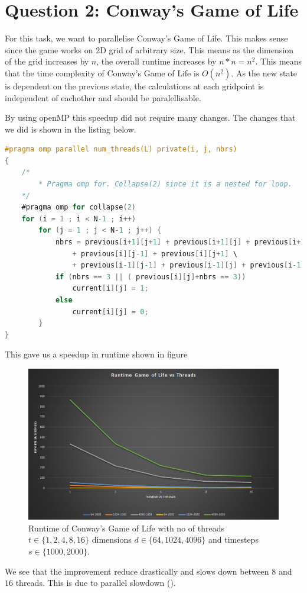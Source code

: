 \section{Question 2: Conway's Game of Life}

For this task, we want to parallelise Conway's Game of Life. 
This makes sense since the game works on 2D grid of arbitrary size. This means 
as the dimension of the grid increases by $n$, the overall runtime increases by
$n*n=n^2$. This means that the time complexity of Conway's Game of Life is 
$O(n^2)$. As the new state is dependent on the previous state, the calculations
at each gridpoint is independent of eachother and should be paralellisable.

By using openMP this speedup did not require many changes. The changes that we did
is shown in the listing below.

\begin{lstlisting}[language=C]
#pragma omp parallel num_threads(L) private(i, j, nbrs)
{
    /*
        * Pragma omp for. Collapse(2) since it is a nested for loop.
    */
    #pragma omp for collapse(2)
    for (i = 1 ; i < N-1 ; i++)
        for (j = 1 ; j < N-1 ; j++) {
            nbrs = previous[i+1][j+1] + previous[i+1][j] + previous[i+1][j-1] \
                + previous[i][j-1] + previous[i][j+1] \
                + previous[i-1][j-1] + previous[i-1][j] + previous[i-1][j+1];
            if (nbrs == 3 || ( previous[i][j]+nbrs == 3))
                current[i][j] = 1;
            else 
                current[i][j] = 0;
        }
}
\end{lstlisting}

This gave us a speedup in runtime shown in figure

\begin{figure}
    \centering
    \includegraphics[width=\linewidth]{Figures/Runtimes.png}
    \caption{
        Runtime of Conway's Game of Life with no of threads $t \in \{1,2,4,8,16\}$
        dimensions $d \in \{64,1024,4096\}$ and timesteps $s \in \{1000,2000\}$.
    }
    \label{fig:colrowlow}
\end{figure}

We see that the improvement reduce drastically and slows down between $8$ and $16$
threads. This is due to parallel slowdown (\cite{enwiki:ppslowdown}).
